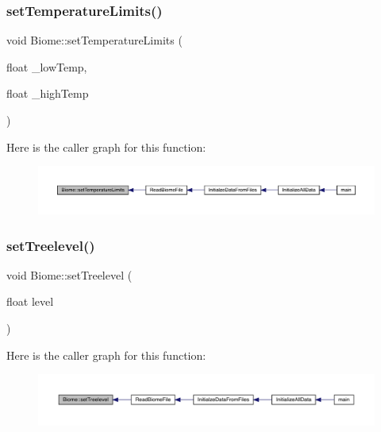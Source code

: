 \subsubsection{\texorpdfstring{set\+Temperature\+Limits()}{setTemperatureLimits()}}
{\footnotesize\ttfamily void Biome\+::set\+Temperature\+Limits (\begin{DoxyParamCaption}\item[{float}]{\+\_\+low\+Temp,  }\item[{float}]{\+\_\+high\+Temp }\end{DoxyParamCaption})}

Here is the caller graph for this function\+:
\nopagebreak
\begin{figure}[H]
\begin{center}
\leavevmode
\includegraphics[width=350pt]{d6/dd0/class_biome_acc568302ef1e66d443d2e43d94b36a10_icgraph}
\end{center}
\end{figure}
\mbox{\label{class_biome_adb9f34f853f233464a33a5dfbb2ccbee}} 
\subsubsection{\texorpdfstring{set\+Treelevel()}{setTreelevel()}}
{\footnotesize\ttfamily void Biome\+::set\+Treelevel (\begin{DoxyParamCaption}\item[{float}]{level }\end{DoxyParamCaption})}

Here is the caller graph for this function\+:
\nopagebreak
\begin{figure}[H]
\begin{center}
\leavevmode
\includegraphics[width=350pt]{d6/dd0/class_biome_adb9f34f853f233464a33a5dfbb2ccbee_icgraph}
\end{center}
\end{figure}
\mbox{\label{class_biome_adbe071450d7411ddd3f886b1c84c2029}} 
